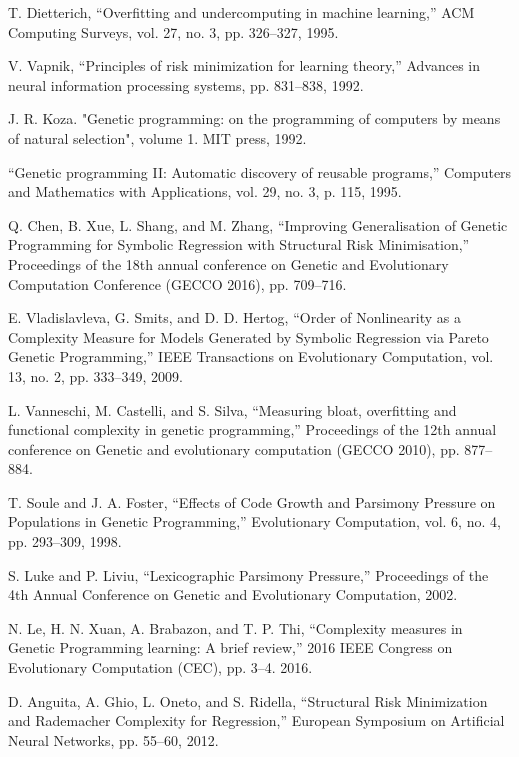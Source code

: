 \documentclass[conference]{IEEEtran}
\begin{document}
\begin{thebibliography}{00}

 T. Dietterich, “Overfitting and undercomputing in machine learning,” ACM Computing Surveys, vol. 27, no. 3, pp. 326--327, 1995.

 V. Vapnik, “Principles of risk minimization for learning theory,” Advances in neural information processing systems, pp. 831--838, 1992.

 J. R. Koza. "Genetic programming: on the programming of computers by means of natural selection", volume 1. MIT press, 1992.

 “Genetic programming II: Automatic discovery of reusable programs,” Computers and Mathematics with Applications, vol. 29, no. 3, p. 115, 1995.

 Q. Chen, B. Xue, L. Shang, and M. Zhang, “Improving Generalisation of Genetic Programming for Symbolic Regression with Structural Risk Minimisation,” Proceedings of the 18th annual conference on Genetic and Evolutionary Computation Conference (GECCO 2016), pp. 709--716.

 E. Vladislavleva, G. Smits, and D. D. Hertog, “Order of Nonlinearity as a Complexity Measure for Models Generated by Symbolic Regression via Pareto Genetic Programming,” IEEE Transactions on Evolutionary Computation, vol. 13, no. 2, pp. 333--349, 2009.

 L. Vanneschi, M. Castelli, and S. Silva, “Measuring bloat, overfitting and functional complexity in genetic programming,” Proceedings of the 12th annual conference on Genetic and evolutionary computation (GECCO 2010), pp. 877--884.

 T. Soule and J. A. Foster, “Effects of Code Growth and Parsimony Pressure on Populations in Genetic Programming,” Evolutionary Computation, vol. 6, no. 4, pp. 293--309, 1998.

 S. Luke and P. Liviu, “Lexicographic Parsimony Pressure,” Proceedings of the 4th Annual Conference on Genetic and Evolutionary Computation, 2002.

 N. Le, H. N. Xuan, A. Brabazon, and T. P. Thi, “Complexity measures in Genetic Programming learning: A brief review,” 2016 IEEE Congress on Evolutionary Computation (CEC), pp. 3--4. 2016.

 D. Anguita, A. Ghio, L. Oneto, and S. Ridella, “Structural Risk Minimization and Rademacher Complexity for Regression,” European Symposium on Artificial Neural Networks, pp. 55--60, 2012. 


\end{thebibliography}
\end{document}
